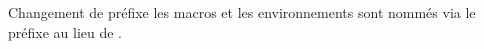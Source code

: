 \begin{bdoctopic}{Changement de préfixe}
    les macros et les environnements sont nommés via le préfixe  au lieu de .
\end{bdoctopic}

